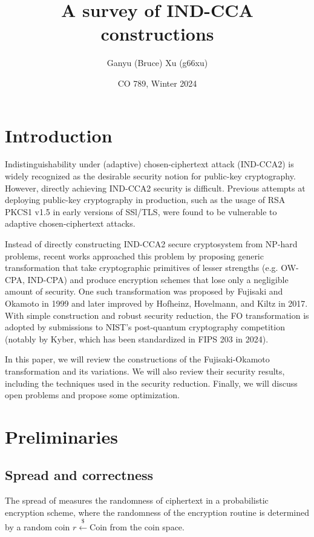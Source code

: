 \documentclass{article}
\title{A survey of IND-CCA constructions}
\author{Ganyu (Bruce) Xu (g66xu)}
\date{CO 789, Winter 2024}
\newcommand{\leftsample}{\overset{{\scriptscriptstyle\$}}{\leftarrow}}
\begin{document}
\maketitle

\section{Introduction}
Indistinguishability under (adaptive) chosen-ciphertext attack (IND-CCA2) is widely recognized as the desirable security notion for public-key cryptography. However, directly achieving IND-CCA2 security is difficult. Previous attempts at deploying public-key cryptography in production, such as the usage of RSA PKCS1 v1.5 in early versions of SSl/TLS, were found to be vulnerable to adaptive chosen-ciphertext attacks.

Instead of directly constructing IND-CCA2 secure cryptosystem from NP-hard problems, recent works approached this problem by proposing generic transformation that take cryptographic primitives of lesser strengths (e.g. OW-CPA, IND-CPA) and produce encryption schemes that lose only a negligible amount of security. One such transformation was proposed by Fujisaki and Okamoto in 1999 and later improved by Hofheinz, Hovelmann, and Kiltz in 2017. With simple construction and robust security reduction, the FO transformation is adopted by submissions to NIST's post-quantum cryptography competition (notably by Kyber, which has been standardized in FIPS 203 in 2024).

In this paper, we will review the constructions of the Fujisaki-Okamoto transformation and its variations. We will also review their security results, including the techniques used in the security reduction. Finally, we will discuss open problems and propose some optimization.

\section{Preliminaries}

\subsection{Spread and correctness}
The spread of measures the randomness of ciphertext in a probabilistic encryption scheme, where the randomness of the encryption routine is determined by a random coin $r \leftsample \text{Coin}$ from the coin space.
\end{document}
